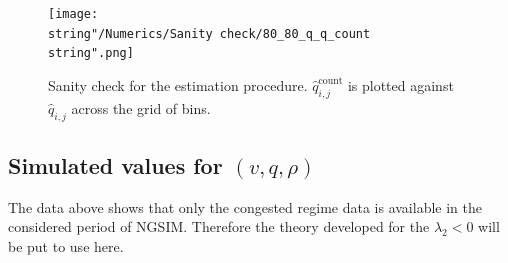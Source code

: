 \documentclass[preprint]{elsarticle}
\begin{document}
\begin{figure}[H]
\centering
\texttt{[image: \\string"/Numerics/Sanity check/80\_80\_q\_q\_count\\string".png]}
\protect\caption{Sanity check for the estimation procedure. $\widehat{q}_{i,j}^{\text{count}}$
is plotted against $\widehat{q}_{i,j}$ across the grid of bins.
\label{fig:Sanity-check}}
\end{figure}

\subsection{Simulated values for $\left(v,q,\rho\right)$}

The data above shows that only the congested regime data is available in the considered period of NGSIM. Therefore the theory developed for the $\lambda_{2}<0$
will be put to use here.
\end{document}
